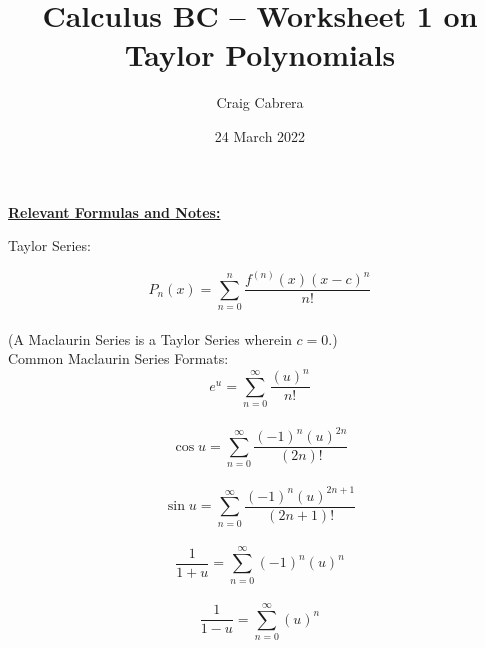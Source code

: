 \documentclass[10pt,letterpaper]{report}
\title{Calculus BC -- Worksheet 1 on Taylor Polynomials }
\author{Craig Cabrera}
\date{24 March 2022}
\begin{document}
\maketitle
\begin{center}
  \textbf{\underline{Relevant Formulas and Notes:}}
\end{center}

\noindent Taylor Series: 

$$P_{n}(x) = \sum_{n=0}^{n}{\frac{f^{(n)}(x)(x-c)^{n}}{n!}}$$ \\

\noindent (A Maclaurin Series is a Taylor Series wherein $c=0$.) \\

\noindent Common Maclaurin Series Formats: \\

$$e^{u}=\sum_{n=0}^{\infty}{\frac{(u)^{n}}{n!}}$$ \\

$$\cos{u} = \sum_{n=0}^{\infty}{\frac{(-1)^{n}(u)^{2n}}{(2n)!}}$$ \\

$$\sin{u} = \sum_{n=0}^{\infty}{\frac{(-1)^{n}(u)^{2n+1}}{(2n+1)!}}$$ \\

$$\frac{1}{1+u} = \sum_{n=0}^{\infty}{(-1)^{n}(u)^{n}}$$ \\

$$\frac{1}{1-u} = \sum_{n=0}^{\infty}{(u)^{n}}$$ \\

\pagebreak 
\end{document}
